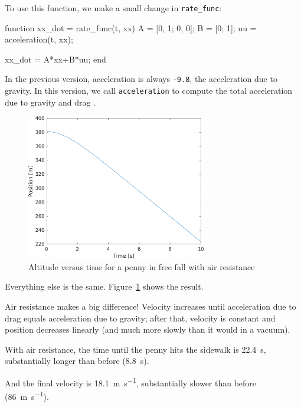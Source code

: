 To use this function, we make a small change in \lstinline{rate_func}:

\begin{code}
function xx_dot = rate_func(t, xx)
    A = [0, 1; 0, 0];
    B = [0; 1];
    uu = acceleration(t, xx);
    
    xx_dot = A*xx+B*uu;
end
\end{code}

In the previous version, acceleration is always \lstinline{-9.8}, the acceleration due to gravity.
In this version, we call \lstinline{acceleration} to compute the total acceleration due to gravity and drag .

\begin{figure}[ht]
\centerline{\includegraphics[width=0.7\textwidth]{../code/chap_secondordersystems/penny_event_drag.png}}
\caption{Altitude versus time for a penny in free fall with air resistance}
\label{fig:penny2}
\end{figure}

Everything else is the same.  Figure~\ref{fig:penny2} shows the result.

Air resistance makes a big difference! Velocity increases until
acceleration due to drag equals acceleration due to gravity; after that, velocity is constant and position decreases linearly (and much more slowly than it would in a vacuum).

With air resistance, the time until the penny hits the sidewalk is \SI{22.4}{\second}, substantially longer than before (\SI{8.8}{\second}).

And the final velocity is \SI{18.1}{\meter \per \second}, substantially slower than before (\SI{86}{\meter \per \second}).

